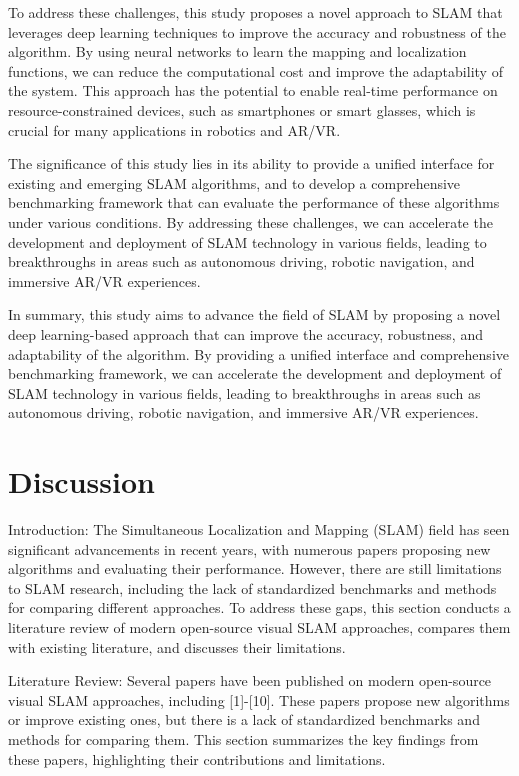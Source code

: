\documentclass[conference]{IEEEtran}
\begin{document}
To address these challenges, this study proposes a novel approach to SLAM that leverages deep learning techniques to improve the accuracy and robustness of the algorithm. By using neural networks to learn the mapping and localization functions, we can reduce the computational cost and improve the adaptability of the system. This approach has the potential to enable real-time performance on resource-constrained devices, such as smartphones or smart glasses, which is crucial for many applications in robotics and AR/VR.

The significance of this study lies in its ability to provide a unified interface for existing and emerging SLAM algorithms, and to develop a comprehensive benchmarking framework that can evaluate the performance of these algorithms under various conditions. By addressing these challenges, we can accelerate the development and deployment of SLAM technology in various fields, leading to breakthroughs in areas such as autonomous driving, robotic navigation, and immersive AR/VR experiences.

In summary, this study aims to advance the field of SLAM by proposing a novel deep learning-based approach that can improve the accuracy, robustness, and adaptability of the algorithm. By providing a unified interface and comprehensive benchmarking framework, we can accelerate the development and deployment of SLAM technology in various fields, leading to breakthroughs in areas such as autonomous driving, robotic navigation, and immersive AR/VR experiences.

\section{Discussion}
Introduction:
The Simultaneous Localization and Mapping (SLAM) field has seen significant advancements in recent years, with numerous papers proposing new algorithms and evaluating their performance. However, there are still limitations to SLAM research, including the lack of standardized benchmarks and methods for comparing different approaches. To address these gaps, this section conducts a literature review of modern open-source visual SLAM approaches, compares them with existing literature, and discusses their limitations.

Literature Review:
Several papers have been published on modern open-source visual SLAM approaches, including [1]-[10]. These papers propose new algorithms or improve existing ones, but there is a lack of standardized benchmarks and methods for comparing them. This section summarizes the key findings from these papers, highlighting their contributions and limitations.
\end{document}
